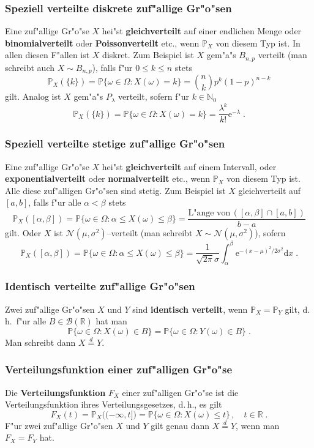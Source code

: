 \documentclass[ngerman,draft,parskip=half,twoside]{scrartcl}
\newcommand*{\R}{\mathbb{R}}      %
\newcommand*{\N}{\mathbb{N}}      %
\newcommand*{\BorelM}{\mathcal{B}}  %
\newcommand*{\WKM}{\mathbb{P}}      %
\begin{document}
\subsubsection{Speziell verteilte diskrete zuf"allige Gr"o"sen}
Eine zuf"allige Gr"o"se $X$ hei"st \textbf{gleichverteilt}
 auf einer endlichen Menge oder \textbf{binomialverteilt}
oder \textbf{Poissonverteilt} etc., wenn $\WKM_X$ von diesem Typ ist. In allen diesen F"allen
ist $X$ diskret. Zum Beispiel ist $X$ gem"a"s $B_{n,p}$ verteilt (man schreibt auch
$X\sim B_{n,p}$), falls f"ur $0\le k\le n$ stets
$$
\WKM_X(\{k\})=\WKM\{\omega\in\Omega : X(\omega)=k\} = {n \choose k} p^k(1-p)^{n-k}
$$
gilt. Analog ist $X$ gem"a"s $P_\lambda$ verteilt, sofern f"ur $k\in\N_0$
$$
\WKM_X(\{k\})=\WKM\{\omega\in\Omega : X(\omega)=k\}=\frac{\lambda^k}{k!}\mathrm e^{-\lambda}\;.
$$
\subsubsection{Speziell verteilte stetige zuf"allige Gr"o"sen}
Eine zuf"allige Gr"o"se $X$ hei"st \textbf{gleichverteilt} auf einem Intervall,
oder \textbf{exponentialverteilt} oder \textbf{normalverteilt} etc., wenn $\WKM_X$ von diesem Typ
ist.
Alle diese zuf"alligen Gr"o"sen sind stetig.
Zum Beispiel ist $X$ gleichverteilt auf $[a,b]$, falls f"ur alle $\alpha<\beta$
stets
$$
\WKM_X([\alpha,\beta])=\WKM\{\omega\in \Omega : \alpha\le X(\omega)\le \beta\}
=\frac{\mbox{L"ange von}\, ([\alpha,\beta]\cap[a,b])}{b-a}
$$
gilt. Oder $X$ ist $\mathcal N(\mu,\sigma^2)$--verteilt (man schreibt $X\sim \mathcal N(\mu,\sigma^2)$),
sofern
$$
\WKM_X([\alpha,\beta])=\WKM\{\omega\in \Omega : \alpha\le X(\omega)\le \beta\}=
\frac{1}{\sqrt{2\pi}\sigma}\int_\alpha^\beta \mathrm e^{-(x-\mu)^2/2\sigma^2}\mathrm d x\;.
$$
\subsubsection{Identisch verteilte zuf"allige Gr"o"sen}
Zwei zuf"allige Gr"o"sen $X$ und $Y$ sind \textbf{identisch verteilt}, wenn $\WKM_X=\WKM_Y$ gilt,
d.\,h.~f"ur alle $B\in\BorelM(\R)$ hat man
$$
\WKM\{\omega\in \Omega : X(\omega)\in B\}= \WKM\{\omega\in \Omega : Y(\omega)\in B\}\;.
$$
Man schreibt dann $X\stackrel{d}{=}Y$.
\subsubsection{Verteilungsfunktion einer zuf"alligen Gr"o"se}
Die \textbf{Verteilungsfunktion} $F_X$ einer zuf"alligen Gr"o"se ist die Verteilungsfunktion
ihres Verteilungsgesetzes, d.\,h., es gilt
$$
F_X(t)=\WKM_X\big((-\infty,t]\big)=\WKM\{\omega\in\Omega : X(\omega)\le t\}\,,\quad t\in \R\;.
$$
F"ur zwei zuf"allige Gr"o"sen $X$ und $Y$ gilt genau dann $X\stackrel{d}{=}Y$, wenn man
$F_X=F_Y$ hat.
\end{document}
